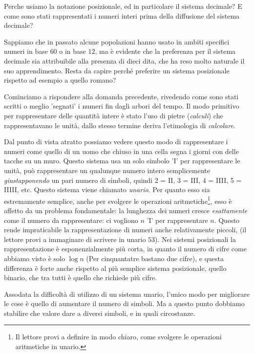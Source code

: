 \documentclass[a4paper]{book}
\theoremstyle{definition}
\newcommand{\nota}[1]{\marginpar[{\raggedleft\small\sffamily #1\\}]{%
 								 {\raggedright\small\sffamily #1\\}}}
\begin{document}
{ \footnotesize

Perche usiamo la notazione posizionale, ed in particolare il sistema decimale?
E come sono stati rappresentati i numeri interi prima della diffusione del
sistema decimale?

Sappiamo che in passato alcune popolazioni hanno usato in ambiti specifici
numeri in base $60$ o in base $12$, ma è evidente che la preferenza per il
sistema decimale sia attribuibile alla presenza di dieci dita, che ha reso
molto naturale il suo apprendimento. Resta da capire perché preferire un
sistema posizionale rispetto ad esempio a quello romano?

Cominciamo a rispondere alla domanda precedente, rivedendo come sono stati
scritti o meglio 'segnati' i numeri fin dagli arbori del tempo. Il modo
primitivo per rappresentare delle quantità intere è stato l'uso di pietre
(\emph{calculi}) che rappresentavano le unità, dallo stesso termine deriva
l'etimologia di \emph{calcolare}.

Dal punto di vista atratto possiamo vedere questo modo di rappresentare i
numeri come quello di un uomo che chiuso in una cella segna i giorni con delle
tacche su un muro. Questo sistema usa un solo simbolo '\textsc{I}' per
rappresentare le unità, può rappresentare un qualunque numero intero
semplicemente \emph{giustapponendo} un pari numero di simboli, quindi 2 =
\textsc{II}, 3 = \textsc{III}, 4 = \textsc{IIII}, 5 = \textsc{IIIII}, etc.
Questo sistema viene chiamato \emph{unario}.\nota{Sistema Unario} Per quanto
esso sia estremamente semplice, anche per svolgere le operazioni
aritmetiche\footnote{Il lettore provi a definire in modo chiaro, come svolgere
le operazioni aritmetiche in unario.}, esso è affetto da un problema
fondamentale: la lunghezza dei numeri cresce \emph{esattamente} come il numero
da rappresentare: ci vogliono $n$ 'I' per rappresentare $n$. Questo rende
impraticabile la rappresentazione di numeri anche relativamente piccoli, (il
lettore provi a immaginare di scrivere in unario $53$). Nei sistemi posizionali
la rappresentazione è esponenzialmente più corta, in quanto il numero di cifre
come abbiamo visto è solo $\log n$ (Per cinquantatre bastano due cifre), e
questa differenza è forte anche rispetto al più semplice sistema posizionale,
quello binario, che tra tutti è quello che richiede più cifre.

Assodata la difficoltà di utilizzo di un sistema unario, l'unico modo per
migliorare le cose è quello di aumentare il numero di simboli. Ma a questo
punto dobbiamo stabilire che valore dare a diversi simboli, e in quali
circostanze.

}
\end{document}
